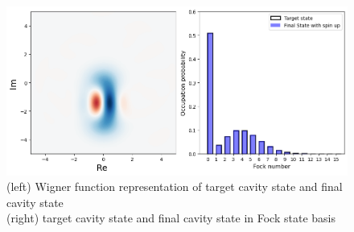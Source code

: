 \documentclass[12pt]{report}
\begin{document}
\begin{figure}[H]
    \centering
    \includegraphics[width=0.95\linewidth]{vac2cat_simulation.png}
    \caption{
       (left) Wigner function representation of target cavity state and final cavity state 
       \\
       (right) target cavity state and final cavity state in Fock state basis
    }
    \label{fig:vac2cat_simulation}
\end{figure}

\end{document}
